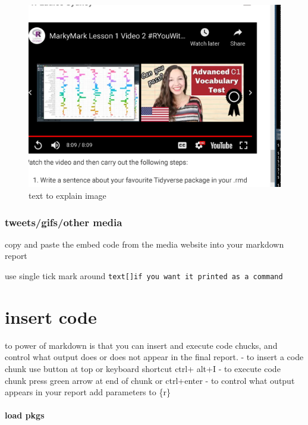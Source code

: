 \documentclass[
]{article}
\begin{document}
\begin{figure}
\centering
\includegraphics{markymarktestimage.png}
\caption{text to explain image}
\end{figure}

\hypertarget{tweetsgifsother-media}{%
\subsubsection{tweets/gifs/other media}\label{tweetsgifsother-media}}

copy and paste the embed code from the media website into your markdown
report

use single tick mark around
\texttt{text{[}{]}if\ you\ want\ it\ printed\ as\ a\ command}

\hypertarget{insert-code}{%
\section{insert code}\label{insert-code}}

to power of markdown is that you can insert and execute code chucks, and
control what output does or does not appear in the final report. - to
insert a code chunk use button at top or keyboard shortcut ctrl+ alt+I -
to execute code chunk press green arrow at end of chunk or ctrl+enter -
to control what output appears in your report add parameters to \{r\}

\hypertarget{load-pkgs}{%
\paragraph{load pkgs}\label{load-pkgs}}
\end{document}
